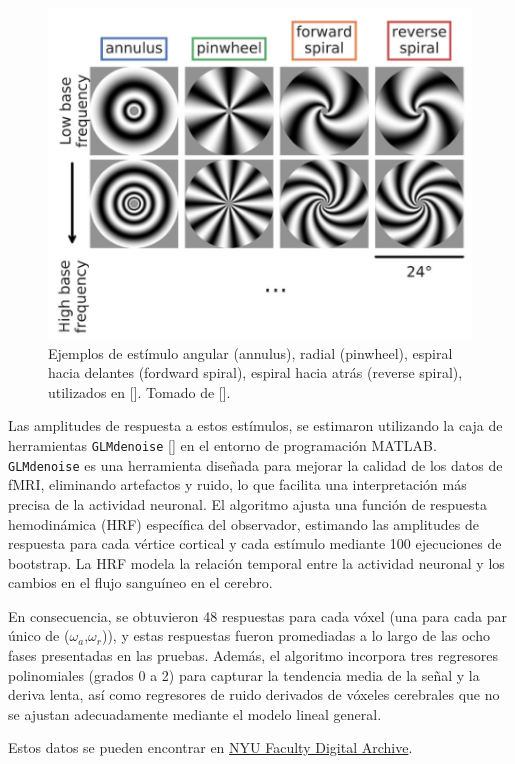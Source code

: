\begin{figure}
	\centering
	\includegraphics[scale=0.8]{Graphics/stimulus}
	\caption{Ejemplos de est\'imulo angular (annulus), radial (pinwheel), espiral hacia delantes (fordward spiral), espiral hacia atr\'as (reverse spiral), utilizados en [\cite{broderick_mapping_2022}]. Tomado de [\cite{broderick_mapping_2022}].}
	\label{fig:stim}
\end{figure}
Las amplitudes de respuesta a estos estímulos, se estimaron utilizando la caja de herramientas \texttt{GLMdenoise} [\cite{kay_glmdenoise_2013}] en el entorno de programación MATLAB. \texttt{GLMdenoise} es una herramienta diseñada para mejorar la calidad de los datos de fMRI, eliminando artefactos y ruido, lo que facilita una interpretación más precisa de la actividad neuronal. El algoritmo ajusta una función de respuesta hemodinámica (HRF) específica del observador, estimando las amplitudes de respuesta para cada v\'ertice cortical y cada estímulo mediante 100 ejecuciones de bootstrap. La HRF modela la relación temporal entre la actividad neuronal y los cambios en el flujo sanguíneo en el cerebro.

En consecuencia, se obtuvieron 48 respuestas para cada vóxel (una para cada par único de ($\omega_a$,$\omega_r$)), y estas respuestas fueron promediadas a lo largo de las ocho fases presentadas en las pruebas. Además, el algoritmo incorpora tres regresores polinomiales (grados 0 a 2) para capturar la tendencia media de la señal y la deriva lenta, así como regresores de ruido derivados de vóxeles cerebrales que no se ajustan adecuadamente mediante el modelo lineal general. 

Estos datos se pueden encontrar en \href{https://archive.nyu.edu/handle/2451/63344}{NYU Faculty Digital Archive}.

